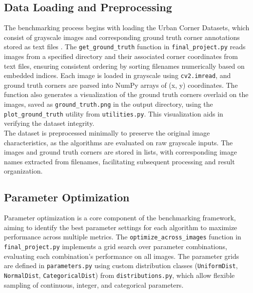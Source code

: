 \documentclass[journal]{IEEEtran}
\begin{document}
\subsection{Data Loading and Preprocessing}
The benchmarking process begins with loading the Urban Corner Datasets, which consist of grayscale images and corresponding ground truth corner annotations stored as text files \cite{Urban_Corner_Dataset}. The \texttt{get\_ground\_truth} function in \texttt{final\_project.py} reads images from a specified directory and their associated corner coordinates from text files, ensuring consistent ordering by sorting filenames numerically based on embedded indices. Each image is loaded in grayscale using \texttt{cv2.imread}, and ground truth corners are parsed into NumPy arrays of (x, y) coordinates. The function also generates a visualization of the ground truth corners overlaid on the images, saved as \texttt{ground\_truth.png} in the output directory, using the \texttt{plot\_ground\_truth} utility from \texttt{utilities.py}. This visualization aids in verifying the dataset integrity.\\

The dataset is preprocessed minimally to preserve the original image characteristics, as the algorithms are evaluated on raw grayscale inputs. The images and ground truth corners are stored in lists, with corresponding image names extracted from filenames, facilitating subsequent processing and result organization.\\

\subsection{Parameter Optimization}
Parameter optimization is a core component of the benchmarking framework, aiming to identify the best parameter settings for each algorithm to maximize performance across multiple metrics. The \texttt{optimize\_across\_images} function in \texttt{final\_project.py} implements a grid search over parameter combinations, evaluating each combination’s performance on all images. The parameter grids are defined in \texttt{parameters.py} using custom distribution classes (\texttt{UniformDist}, \texttt{NormalDist}, \texttt{CategoricalDist}) from \texttt{distributions.py}, which allow flexible sampling of continuous, integer, and categorical parameters.\\
\end{document}
